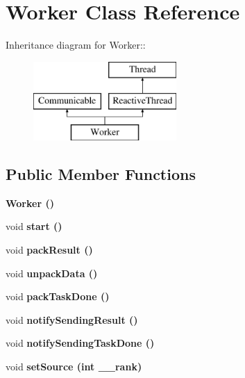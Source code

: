 \section{Worker Class Reference}
\label{class_worker}
Inheritance diagram for Worker::\begin{figure}[H]
\begin{center}
\leavevmode
\includegraphics[height=3cm]{class_worker}
\end{center}
\end{figure}
\subsection*{Public Member Functions}
\begin{CompactItemize}
\item 
\bf{Worker} ()\label{class_worker_3754817df06ffe220f7f0d903c78ccac}

\item 
void \bf{start} ()\label{class_worker_abcbbace05c6113f1959c494b3577291}

\item 
void \bf{pack\-Result} ()\label{class_worker_83780920118e6c2b67d9477bdf8be248}

\item 
void \bf{unpack\-Data} ()\label{class_worker_bff2bdcd64fe5400156cc78704c64953}

\item 
void \bf{pack\-Task\-Done} ()\label{class_worker_60d2e8eba85b9ef403d94be54c391640}

\item 
void \bf{notify\-Sending\-Result} ()\label{class_worker_e2f487014766a73c5788bdcfd58ad863}

\item 
void \bf{notify\-Sending\-Task\-Done} ()\label{class_worker_13efd6a8e275745329a4a8e23a0eb0bb}

\item 
void \bf{set\-Source} (int \_\-\_\-rank)\label{class_worker_5dab4ea663546b5a49d9398d7a624d27}

\end{CompactItemize}
